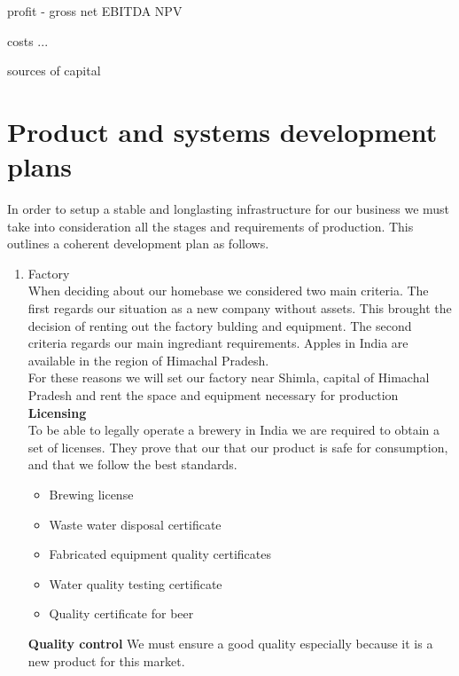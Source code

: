 \documentclass{article}
\begin{document}
profit
 - gross
   net
   EBITDA
   NPV

costs
 ...

sources of capital
\section{Product and systems development plans}
In order to setup a stable and longlasting infrastructure for our business we must take into consideration all the stages and requirements of production. This outlines a coherent development plan as follows.

	\begin{enumerate}
	\item Factory \\
When deciding about our homebase we considered two main criteria. The first regards our situation as a new company without assets. This brought the decision of renting out the factory bulding and equipment. The second criteria regards our main ingrediant requirements. Apples in India are available in the region of Himachal Pradesh. \\

For these reasons we will set our factory near Shimla, capital of Himachal Pradesh and rent the space and equipment necessary for production \\

\textbf{Licensing}\\
	To be able to legally operate a brewery in India we are required to obtain a set of licenses. They prove that our that our product is safe for consumption, and that we follow the best standards.\\
	\begin{itemize}
		\item Brewing license\\
		\item Waste water disposal certificate\\
		\item Fabricated equipment quality certificates\\
		\item Water quality testing certificate\\
		\item Quality certificate for beer\\
	\end{itemize}

\textbf{Quality control}
We must ensure a good quality especially because it is a new product for this market.


\end{enumerate}
\end{document}
